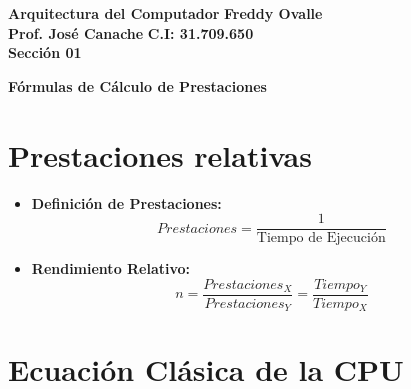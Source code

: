 \documentclass[12pt,a4paper]{article}
\begin{document}
\begin{flushleft}
\textbf{Arquitectura del Computador} \hfill \textbf{Freddy Ovalle} \\
\textbf{Prof. José Canache} \hfill \textbf{C.I: 31.709.650} \\
\textbf{Sección 01}
\end{flushleft}

\vspace{1cm}

\begin{center}
\Large{\textbf{Fórmulas de Cálculo de Prestaciones}}
\end{center}

\vspace{0.5cm}

\section*{Prestaciones relativas}

\begin{itemize}
    \item \textbf{Definición de Prestaciones:} 
    $$Prestaciones = \frac{1}{\text{Tiempo de Ejecución}}$$

    \item \textbf{Rendimiento Relativo:} 
    $$n = \frac{Prestaciones_X}{Prestaciones_Y} = \frac{Tiempo_Y}{Tiempo_X}$$
\end{itemize}

\section*{Ecuación Clásica de la CPU}
\end{document}
